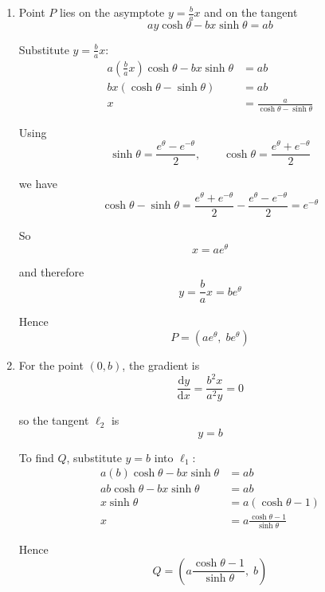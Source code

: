 \documentclass[leqno]{article}
\begin{document}
\begin{enumerate}[
  label=\textbf{\arabic*.},
  leftmargin=*,
  topsep=0pt,
  partopsep=0pt,
  parsep=0pt
]
\begin{djsSolution}
\begin{enumerate}[label=\textbf{(\alph*)}]
So the tangent is
\[
y-b\cosh\theta=\frac{b\sinh\theta}{a\cosh\theta}\left(x-a\sinh\theta\right)
\]

Multiply by $a\cosh\theta$:
\[
ay\cosh\theta-ab\cosh^2\theta=bx\sinh\theta-ab\sinh^2\theta
\]

Hence
\begin{align*}
ay\cosh\theta-bx\sinh\theta
&=ab\left(\cosh^2\theta-\sinh^2\theta\right)\\
&=ab
\end{align*}

Therefore the tangent may be written as
\[
ay\cosh\theta-bx\sinh\theta=ab
\]

  \item Point $P$ lies on the asymptote $y=\frac{b}{a}x$ and on the tangent
\[
ay\cosh\theta-bx\sinh\theta=ab
\]

Substitute $y=\frac{b}{a}x$:
\begin{align*}
a\left(\frac{b}{a}x\right)\cosh\theta-bx\sinh\theta&=ab\\
bx(\cosh\theta-\sinh\theta)&=ab\\
x&=\frac{a}{\cosh\theta-\sinh\theta}
\end{align*}

Using
\[
\sinh\theta=\frac{e^\theta-e^{-\theta}}{2},\qquad \cosh\theta=\frac{e^\theta+e^{-\theta}}{2}
\]

we have
\[
\cosh\theta-\sinh\theta
=\frac{e^\theta+e^{-\theta}}{2}-\frac{e^\theta-e^{-\theta}}{2}
=e^{-\theta}
\]

So
\[
x=ae^\theta
\]

and therefore
\[
y=\frac{b}{a}x=be^\theta
\]

Hence
\[
P=(ae^\theta,\;be^\theta)
\]

  \item For the point $(0,b)$, the gradient is
\[
\frac{\mathrm{d}y}{\mathrm{d}x}=\frac{b^2x}{a^2y}=0
\]

so the tangent $\ell_2$ is
\[
y=b
\]

To find $Q$, substitute $y=b$ into $\ell_1$:
\begin{align*}
a(b)\cosh\theta-bx\sinh\theta&=ab\\
ab\cosh\theta-bx\sinh\theta&=ab\\
x\sinh\theta&=a(\cosh\theta-1)\\
x&=a\frac{\cosh\theta-1}{\sinh\theta}
\end{align*}

Hence
\[
Q=\left(a\frac{\cosh\theta-1}{\sinh\theta},\;b\right)
\]


\end{enumerate}
\end{djsSolution}
\end{enumerate}
\end{document}
